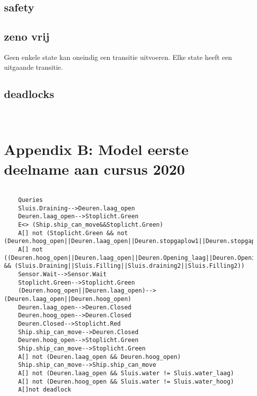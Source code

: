 \subsection{safety}
 
 \subsection{zeno vrij}
 Geen enkele state kan oneindig een transitie uitvoeren. Elke state heeft een uitgaande transitie.
 
 \subsection{deadlocks}
 
 \newpage
 
 \section{\\ Appendix B: Model eerste deelname aan cursus 2020}
 

 
 
 
 \begin{verbatim}
 	
 	Queries
 	Sluis.Draining-->Deuren.laag_open
 	Deuren.laag_open-->Stoplicht.Green
 	E<> (Ship.ship_can_move&&Stoplicht.Green)
 	A[] not (Stoplicht.Green && not (Deuren.hoog_open||Deuren.laag_open||Deuren.stopgaplow1||Deuren.stopgaplow2||Deuren.stopgaphigh1||Deuren.stopgaphigh2))
 	A[] not ((Deuren.hoog_open||Deuren.laag_open||Deuren.Opening_laag||Deuren.Opening_hoog||Deuren.Closing_hoog||Deuren.Closing_laag) && (Sluis.Draining||Sluis.Filling||Sluis.draining2||Sluis.Filling2))
 	Sensor.Wait-->Sensor.Wait
 	Stoplicht.Green-->Stoplicht.Green
 	(Deuren.hoog_open||Deuren.laag_open)-->(Deuren.laag_open||Deuren.hoog_open)
 	Deuren.laag_open-->Deuren.Closed
 	Deuren.hoog_open-->Deuren.Closed
 	Deuren.Closed-->Stoplicht.Red
 	Ship.ship_can_move-->Deuren.Closed
 	Deuren.hoog_open-->Stoplicht.Green
 	Ship.ship_can_move-->Stoplicht.Green
 	A[] not (Deuren.laag_open && Deuren.hoog_open)
 	Ship.ship_can_move-->Ship.ship_can_move
 	A[] not (Deuren.laag_open && Sluis.water != Sluis.water_laag)
 	A[] not (Deuren.hoog_open && Sluis.water != Sluis.water_hoog)
 	A[]not deadlock
 	
	
 \end{verbatim}
 

